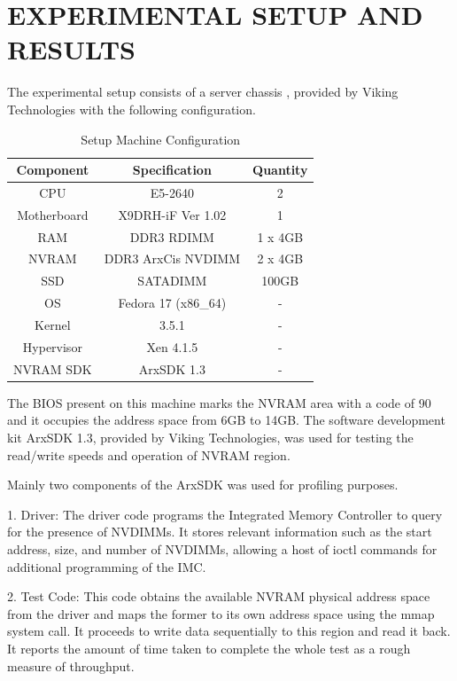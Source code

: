

\chapter{\uppercase{Experimental Setup and Results}}

The experimental setup consists of a server chassis \cite{arxcis}, provided by Viking Technologies with the following configuration. 


\begin{table}[H]
\centering
\caption{Setup Machine Configuration}
\label{tab:setup_conf}
\begin{tabular}{|c|c|c|}
    \hline
    Component & Specification & Quantity \\
    \hline
    \hline
    CPU & E5-2640 & 2                    \\
    \hline
    Motherboard & X9DRH-iF Ver 1.02 & 1  \\
    \hline
    RAM & DDR3 RDIMM & 1 x 4GB           \\
    \hline
    NVRAM & DDR3 ArxCis NVDIMM & 2 x 4GB \\
    \hline
    SSD & SATADIMM & 100GB               \\
    \hline
    OS & Fedora 17 (x86\_64) & -         \\
    \hline
    Kernel & 3.5.1 & -                   \\
    \hline
    Hypervisor & Xen 4.1.5 & -           \\
    \hline
    NVRAM SDK & ArxSDK 1.3 & -           \\
    \hline
\end{tabular}
\end{table}

The BIOS present on this machine marks the NVRAM area with a code of 90 and it occupies the address space from 6GB to 14GB. The software development kit ArxSDK 1.3, provided by Viking Technologies, was used for testing the read/write speeds and operation of NVRAM region.

Mainly two components of the ArxSDK was used for profiling purposes.

1. Driver: The driver code programs the Integrated Memory Controller to query for the presence of NVDIMMs. It stores relevant information such as the start address, size, and number of NVDIMMs, allowing a host of ioctl commands for additional programming of the IMC.

2. Test Code: This code obtains the available NVRAM physical address space from the driver and maps the former to its own address space using the mmap system call. It proceeds to write data sequentially to this region and read it back. It reports the amount of time taken to complete the whole test as a rough measure of throughput.


